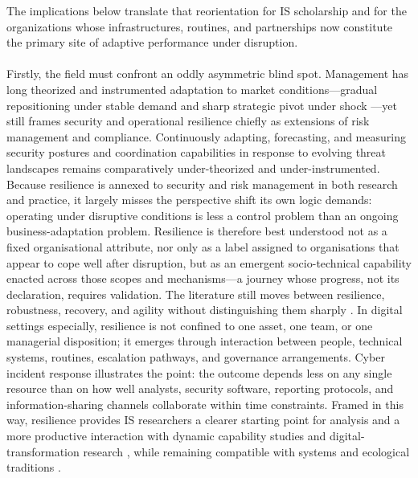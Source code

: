 The implications below translate that reorientation for IS scholarship and for the organizations whose infrastructures, routines, and partnerships now constitute the primary site of adaptive performance under disruption.\\
\\
Firstly, the field must confront an oddly asymmetric blind spot. Management has long theorized and instrumented adaptation to market conditions---gradual repositioning under stable demand and sharp strategic pivot under shock \autocite{teece2007explicating,duchek2019organizational}---yet still frames security and operational resilience chiefly as extensions of risk management and compliance. Continuously adapting, forecasting, and measuring security postures and coordination capabilities in response to evolving threat landscapes remains comparatively under-theorized and under-instrumented. Because resilience is annexed to security and risk management in both research and practice, it largely misses the perspective shift its own logic demands: operating under disruptive conditions is less a control problem than an ongoing business-adaptation problem. Resilience is therefore best understood not as a fixed organisational attribute, nor only as a label assigned to organisations that appear to cope well after disruption, but as an emergent socio-technical capability enacted across those scopes and mechanisms---a journey whose progress, not its declaration, requires validation. The literature still moves between resilience, robustness, recovery, and agility without distinguishing them sharply \autocite{woods2015four}. In digital settings especially, resilience is not confined to one asset, one team, or one managerial disposition; it emerges through interaction between people, technical systems, routines, escalation pathways, and governance arrangements. Cyber incident response illustrates the point: the outcome depends less on any single resource than on how well analysts, security software, reporting protocols, and information-sharing channels collaborate within time constraints. Framed in this way, resilience provides IS researchers a clearer starting point for analysis and a more productive interaction with dynamic capability studies \autocite{henfridsson2013generative,boh2023building} and digital-transformation research \autocite{vial2019understanding,hanelt2021systematic,wessel2021unpacking}, while remaining compatible with systems and ecological traditions \autocite{wiener1948cybernetics,holling1973resilience}.\\
\\
